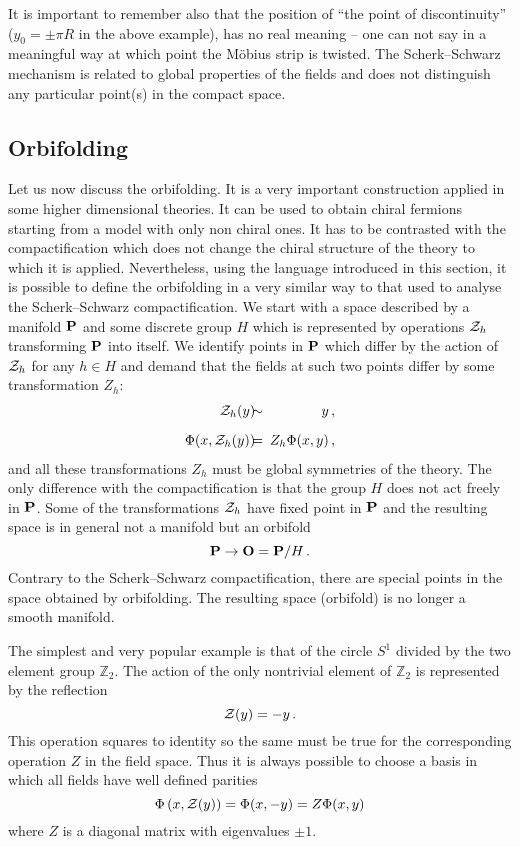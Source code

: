 \documentclass[a4paper,12pt]{article}
\def\cZ{{\cal Z}}
\def\bO{{\bf O}}
\def\bP{{\bf P}}
\def\ZZ{\mathbb Z}
\begin{document}
It is important to remember also that the position of ``the point of
discontinuity'' ($y_0=\pm\pi R$ in the above example), has no real
meaning -- one can not say in a 
meaningful way at which point the M\"obius strip is twisted.
The Scherk--Schwarz mechanism is related to global properties of
the fields and does not distinguish any particular point(s) in the
compact space. 




\subsection{Orbifolding}


Let us now discuss the orbifolding. It is a very important
construction applied in some higher dimensional theories. It can be
used to obtain chiral fermions starting from a model with only non
chiral ones. It has to be contrasted with the compactification which
does not change the chiral structure of the theory to which it is
applied. Nevertheless, using the language introduced in this section,
it is possible to define the orbifolding in a very similar way to that
used to analyse the Scherk--Schwarz compactification. We start with a
space described by a manifold $\bP$ and some discrete group $H$ which
is represented by operations $\cZ_h$ transforming $\bP$ into
itself. We identify points in $\bP$ which differ by the action of
$\cZ_h$ for any $h\in H$ and demand that the fields at such two points
differ by some transformation $Z_h$:
\begin{eqnarray}
\cZ_h(y) 
\!\!\!&\sim&\!\!\!
y
\,,
\\[6pt]
\Phi(x,\cZ_h(y))
\!\!\!&=&\!\!\!
Z_h\Phi(x,y)
\,,
\end{eqnarray}
and all these transformations $Z_h$ must be global symmetries of the
theory. 
The only difference with the compactification is that the group $H$
does not act freely in $\bP$. Some of the transformations $\cZ_h$ have
fixed point in $\bP$ and the resulting space is in general not a
manifold but an orbifold 
\begin{equation}
\bP \to \bO=\bP/H
\,.
\end{equation}
Contrary to the Scherk--Schwarz compactification, there are special
points in the space obtained by orbifolding. The resulting space
(orbifold) is no longer a smooth manifold.


The simplest and very popular example is that of the circle $S^1$
divided by the two element group $\ZZ_2$. The action of the only
nontrivial element of $\ZZ_2$ is represented by the reflection
\begin{equation}
\cZ(y)=-y
\,.
\end{equation}
This operation squares to identity so the same must be true for the
corresponding operation $Z$ in the field space. Thus it is always
possible to choose a basis in which all fields have well defined
parities
\begin{equation}
\Phi\left(x,\cZ(y)\right)=\Phi(x,-y)=Z\Phi(x,y)
\end{equation}
where $Z$ is a diagonal matrix with eigenvalues $\pm1$.
\end{document}
